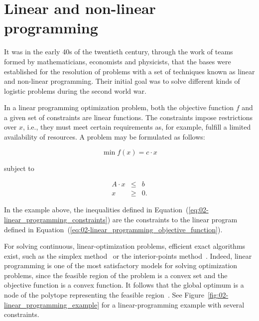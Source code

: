 \section{Linear and non-linear programming}

It was in the early 40s of the twentieth century, through the work
of teams formed by mathematicians, economists and physicists, that
the bases were established for the resolution of problems with a set
of techniques known as linear and non-linear programming. Their initial
goal was to solve different kinds of logistic problems during the
second world war.

In a linear programming optimization problem, both the objective function
$f$ and a given set of constraints are linear functions. The constraints
impose restrictions over $x$, i.e., they must meet certain requirements
as, for example, fulfill a limited availability of resources. A problem
may be formulated as follows:

\begin{equation}
\min f(x)=c\cdot x\label{eq:02-linear_programming_objective_function}
\end{equation}


\noindent subject to

\begin{eqnarray}
A\cdot x & \le & b\nonumber \\
x & \ge & 0.\label{eq:02-linear_programming_constraints}
\end{eqnarray}


\noindent In the example above, the inequalities defined in Equation~(\ref{eq:02-linear_programming_constraints})
are the constraints to the linear program defined in Equation~(\ref{eq:02-linear_programming_objective_function}).

For solving continuous, linear-optimization problems, efficient exact
algorithms exist, such as the simplex method~\cite{Dantzig-Maximization_of_a_linear_function_of_variables_subject_to_linear_inequalities:1951}
or the interior-points method~\cite{Karmarkar-A_new_polynomial_time_algorithm_for_linear_programming:1984}.
Indeed, linear programming is one of the most satisfactory models
for solving optimization problems, since the feasible region of the
problem is a convex set and the objective function is a convex function.
It follows that the global optimum is a node of the polytope representing
the feasible region~\cite{Talbi_Metaheuristics:2009}. See Figure~\ref{fig:02-linear_programming_example}
for a linear-programming example with several constraints.


